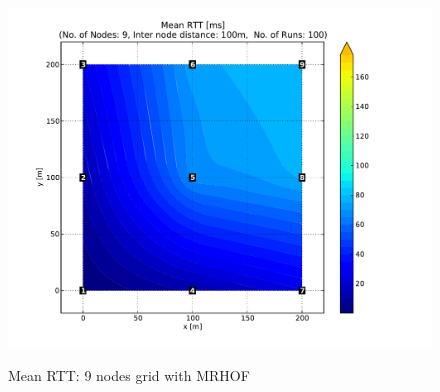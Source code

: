 \begin{figure}[htbp]
{      \hspace{-30pt}
      \includegraphics[scale=0.23]{Pics/results/9/MRHOF/grid/dist100_montecarlo_contour.pdf}}
  \caption{Mean RTT: 9 nodes grid with MRHOF}
 \label{fig:rtt_9_grid_mrhof}
\end{figure}
   
